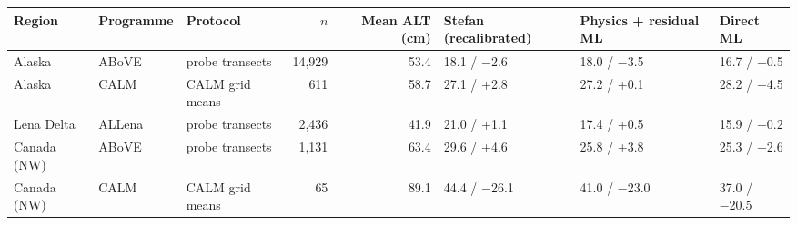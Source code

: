 \begin{tabular}{@{}lllrrlll@{}}
\toprule
Region & Programme & Protocol & $n$ & Mean ALT (cm) & Stefan (recalibrated) & Physics + residual ML & Direct ML \\
\midrule
Alaska & ABoVE & probe transects & 14,929 & 53.4 & 18.1 / −2.6 & 18.0 / −3.5 & 16.7 / +0.5 \\
Alaska & CALM & CALM grid means & 611 & 58.7 & 27.1 / +2.8 & 27.2 / +0.1 & 28.2 / −4.5 \\
Lena Delta & ALLena & probe transects & 2,436 & 41.9 & 21.0 / +1.1 & 17.4 / +0.5 & 15.9 / −0.2 \\
Canada (NW) & ABoVE & probe transects & 1,131 & 63.4 & 29.6 / +4.6 & 25.8 / +3.8 & 25.3 / +2.6 \\
Canada (NW) & CALM & CALM grid means & 65 & 89.1 & 44.4 / −26.1 & 41.0 / −23.0 & 37.0 / −20.5 \\
\bottomrule
\end{tabular}
